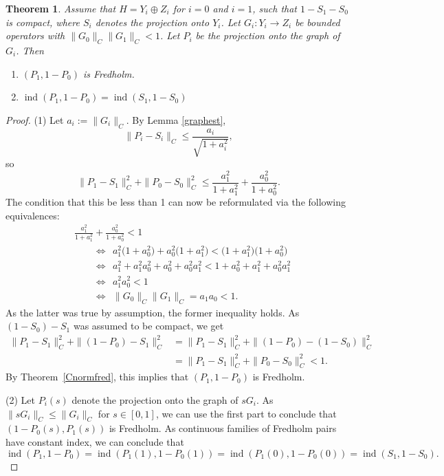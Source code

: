 \documentclass[10pt,a4paper]{amsart}
\numberwithin{equation}{section}
\newtheorem{Theorem}{Theorem}[section]
\DeclareMathOperator{\ind}{ind}
\begin{document}
\begin{Theorem}	\label {graphfred}
		Assume that $H=Y_i\oplus Z_i$ for $i=0$ and $i=1$, such that $1-S_1-S_0$ is compact, where $S_i$ denotes the projection onto $Y_i$. Let $G_i\colon Y_i\rightarrow Z_i$ be bounded operators with $\|G_0\|_C\|G_1\|_C<1$. Let $P_i$ be the projection onto the graph of~$G_i$. Then
		\begin{enumerate}\itemsep=0pt
			\item[$(1)$] $(P_1,1-P_0)$ is Fredholm.
			\item[$(2)$] $\ind(P_1,1-P_0)=\ind(S_1,1-S_0)$
		\end{enumerate}
	\end{Theorem}
	\begin{proof}
		(1) Let $a_i:=\|G_i\|_C$. By Lemma \ref{graphest}, \[\|P_i-S_i\|_C\leq\frac{a_i}{\sqrt{1+a_i^2}},\]
			so
			\[\|P_1-S_1\|_C^2+\|P_0-S_0\|_C^2\leq \frac{a_1^2}{1+a_1^2}+\frac{a_0^2}{1+a_0^2}.\]
			The condition that this be less than 1 can now be reformulated via the following equivalences:
			\begin{align*}
				&   \frac{a_1^2}{1+a_1^2}+\frac{a_0^2}{1+a_0^2}<1\\
				&\qquad{}\Leftrightarrow\ \  a_1^2\bigl(1+a_0^2\bigr)+a_0^2\bigl(1+a_1^2\bigr)<\bigl(1+a_1^2\bigr)\bigl(1+a_0^2\bigr)\\
				&\qquad{}\Leftrightarrow\ \  a_1^2+a_1^2a_0^2+a_0^2+a_0^2a_1^2<1+a_0^2+a_1^2+a_0^2a_1^2\\
				&\qquad{}\Leftrightarrow\ \  a_1^2a_0^2<1\\
				&\qquad{}\Leftrightarrow\ \ \|G_0\|_C\|G_1\|_C=a_1a_0<1.
			\end{align*}
			As the latter was true by assumption, the former inequality holds. As $(1-S_0)-S_1$ was assumed to be compact, we get
			 \begin{align*}
			 	\|P_1-S_1\|_C^2+\|(1-P_0)-S_1\|_C^2
				&=\|P_1-S_1\|_C^2+\|(1-P_0)-(1-S_0)\|_C^2\\
				&=\|P_1-S_1\|_C^2+\|P_0-S_0\|_C^2
				<1.
			\end{align*}
By Theorem~\ref{Cnormfred}, this implies that $(P_1,1-P_0)$ is Fredholm.
			

(2) Let $P_i(s)$ denote the projection onto the graph of $sG_i$. As $\|sG_i\|_C\leq\|G_i\|_C$ for $s\in[0,1]$, we can use the first part to conclude that $(1-P_0(s),P_1(s))$ is Fredholm. As continuous families of Fredholm pairs have constant index, we can conclude that
			\[
\ind(P_1,1-P_0)=\ind(P_1(1),1-P_0(1))=\ind(P_1(0),1-P_0(0))=\ind(S_1,1-S_0).
\tag*{\qed}
\]
\renewcommand{\qed}{}
\end{proof}
\end{document}
